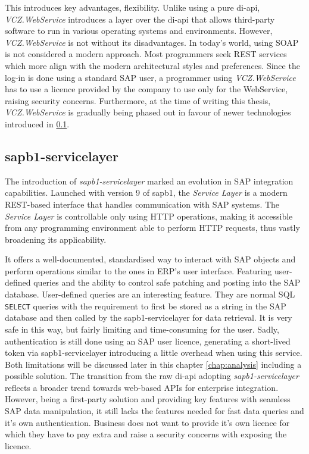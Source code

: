 This introduces key advantages, flexibility. 
Unlike using a pure \gls{di-api}, \textit{VCZ.WebService} introduces a layer over the \gls{di-api} that allows third-party software to run in various operating systems and environments.
However, \textit{VCZ.WebService} is not without its disadvantages.
In today's world, using \ac{SOAP} is not considered a modern approach. Most programmers seek \ac{REST} services which more align with the modern architectural styles and preferences.
Since the log-in is done using a standard SAP user, a programmer using \textit{VCZ.WebService} has to use a licence provided by the company to use only for the WebService, raising security concerns.
Furthermore, at the time of writing this thesis, \textit{VCZ.WebService} is gradually being phased out in favour of newer technologies introduced in \ref{subsec:sap-b1-service-layer}.

\subsection{\gls{sapb1-servicelayer}}
\label{subsec:sap-b1-service-layer}

The introduction of \textit{ \gls{sapb1-servicelayer}} marked an evolution in SAP integration capabilities. 
Launched with version 9 of \gls{sapb1}, the \textit{Service Layer} is a modern \ac{REST}-based interface that handles communication with SAP systems. 
The \textit{Service Layer} is controllable only using HTTP operations, making it accessible from any programming environment able to perform HTTP requests, thus vastly broadening its applicability.

It offers a well-documented, standardised way to interact with SAP objects and perform operations similar to the ones in \ac{ERP}'s user interface. 
Featuring user-defined queries and the ability to control safe patching and posting into the SAP database.
User-defined queries are an interesting feature. They are normal SQL \texttt{SELECT} queries with the requirement to first be stored as a string in the SAP database and then called by the \gls{sapb1-servicelayer} for data retrieval.
It is very safe in this way, but fairly limiting and time-consuming for the user. 
Sadly, authentication is still done using an SAP user licence, generating a short-lived token via \gls{sapb1-servicelayer} introducing a little overhead when using this service.
Both limitations will be discussed later in this chapter \ref{chap:analysis} including a possible solution.
The transition from the raw \gls{di-api} adopting \textit{\gls{sapb1-servicelayer}} reflects a broader trend towards web-based APIs for enterprise integration.
However, being a first-party solution and providing key features with seamless SAP data manipulation, it still lacks the features needed for fast data queries and it's own authentication. Business does not want to provide it's own licence for which they have to pay extra and raise a security concerns with exposing the licence.

